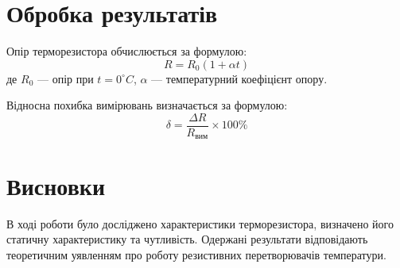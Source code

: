 \documentclass[a4paper]{article}
\begin{document}
\section*{Обробка результатів}
Опір терморезистора обчислюється за формулою:
\begin{equation}
    R = R_0 (1 + \alpha t)
\end{equation}
де $R_0$ — опір при $t = 0^{\circ}C$, $\alpha$ — температурний коефіцієнт опору.

Відносна похибка вимірювань визначається за формулою:
\begin{equation}
    \delta = \frac{\Delta R}{R_{вим}} \times 100\%
\end{equation}

\section*{Висновки}
В ході роботи було досліджено характеристики терморезистора, визначено його статичну характеристику та чутливість. Одержані результати відповідають теоретичним уявленням про роботу резистивних перетворювачів температури.
\end{document}
